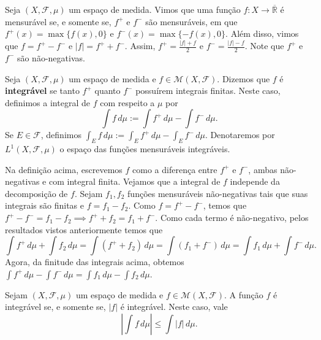 
Seja $(X, \mathcal{F}, \mu)$ um espaço de medida. Vimos que uma função $f: X \to \overline{\mathbb{R}}$ é mensurável se, e somente se, $f^+$ e $f^-$ são mensuráveis, em que $f^+(x) = \max\{f(x), 0\}$ e $f^-(x) = \max\{-f(x), 0\}$.
Além disso, vimos que $f = f^+ - f^-$ e $|f| = f^+ + f^-$. Assim, $f^+ = \frac{|f| + f}{2}$ e $f^- = \frac{|f| - f}{2}$. Note que $f^+$ e $f^-$ são não-negativas.

\begin{definition*}{}
Seja $(X, \mathcal{F}, \mu)$ um espaço de medida e $f \in \mathcal{M}(X, \mathcal{F})$. Dizemos que $f$ é \textbf{integrável} se tanto $f^+$ quanto $f^-$ possuírem integrais finitas. Neste caso, definimos a integral de $f$ com respeito a $\mu$ por
$$ \int f \, d\mu := \int f^+ \, d\mu - \int f^- \, d\mu. $$
Se $E \in \mathcal{F}$, definimos $\int_E f \, d\mu := \int_E f^+ \, d\mu - \int_E f^- \, d\mu$. Denotaremos por $L^1(X, \mathcal{F}, \mu)$ o espaço das funções mensuráveis integráveis.
\end{definition*}

Na definição acima, escrevemos $f$ como a diferença entre $f^+$ e $f^-$, ambas não-negativas e com integral finita. Vejamos que a integral de $f$ independe da decomposição de $f$.
Sejam $f_1, f_2$ funções mensuráveis não-negativas tais que suas integrais são finitas e $f = f_1 - f_2$.
Como $f = f^+ - f^-$, temos que $f^+ - f^- = f_1 - f_2 \implies f^+ + f_2 = f_1 + f^-$. 
Como cada termo é não-negativo, pelos resultados vistos anteriormente temos que
$$ \int f^+ \, d\mu + \int f_2 \, d\mu = \int (f^+ + f_2) \, d\mu = \int (f_1 + f^-) \, d\mu = \int f_1 \, d\mu + \int f^- \, d\mu. $$
Agora, da finitude das integrais acima, obtemos $\int f^+ \, d\mu - \int f^- \, d\mu = \int f_1 \, d\mu - \int f_2 \, d\mu$.

\begin{theorem*}{}
Sejam $(X, \mathcal{F}, \mu)$ um espaço de medida e $f \in \mathcal{M}(X, \mathcal{F})$. A função $f$ é integrável se, e somente se, $|f|$ é integrável. Neste caso, vale
$$ \left| \int f \, d\mu \right| \le \int |f| \, d\mu. $$
\end{theorem*}


